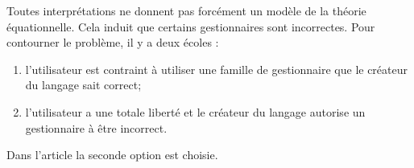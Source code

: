 	
	Toutes interprétations ne donnent pas forcément un modèle de la théorie équationnelle. Cela induit que certains gestionnaires sont incorrectes. 
	Pour contourner le problème, il y a deux écoles :
	\begin{enumerate}
		\item l'utilisateur est contraint à utiliser une famille de gestionnaire que le créateur du langage sait correct;
		\item l'utilisateur a une totale liberté et le créateur du langage autorise un gestionnaire à être incorrect.
	\end{enumerate}
	Dans l'article la seconde option est choisie.
	
	